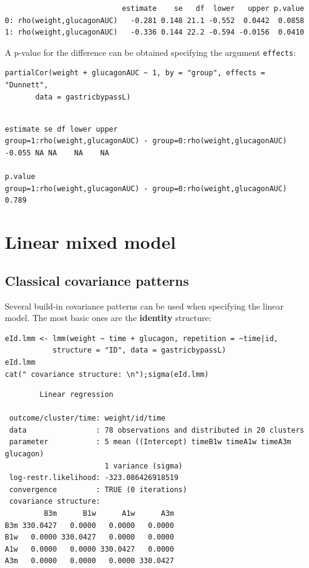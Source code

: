\documentclass[12pt]{article}
\begin{document}
\begin{verbatim}
                           estimate    se   df  lower   upper p.value
0: rho(weight,glucagonAUC)   -0.281 0.148 21.1 -0.552  0.0442  0.0858
1: rho(weight,glucagonAUC)   -0.336 0.144 22.2 -0.594 -0.0156  0.0410
\end{verbatim}


A p-value for the difference can be obtained specifying the argument
\texttt{effects}:
\lstset{language=r,label= ,caption= ,captionpos=b,numbers=none}
\begin{lstlisting}
partialCor(weight + glucagonAUC ~ 1, by = "group", effects = "Dunnett",
	   data = gastricbypassL)
\end{lstlisting}

\begin{verbatim}
                                                                  estimate se df lower upper
group=1:rho(weight,glucagonAUC) - group=0:rho(weight,glucagonAUC)   -0.055 NA NA    NA    NA
                                                                  p.value
group=1:rho(weight,glucagonAUC) - group=0:rho(weight,glucagonAUC)   0.789
\end{verbatim}


\clearpage

\section{Linear mixed model}
\label{sec:org8316d10}
\subsection{Classical covariance patterns}
\label{sec:org7509ee0}

Several build-in covariance patterns can be used when specifying the
linear model. The most basic ones are the \textbf{identity} structure:
\lstset{language=r,label= ,caption= ,captionpos=b,numbers=none}
\begin{lstlisting}
eId.lmm <- lmm(weight ~ time + glucagon, repetition = ~time|id, 
	       structure = "ID", data = gastricbypassL)
eId.lmm
cat(" covariance structure: \n");sigma(eId.lmm)
\end{lstlisting}

\begin{verbatim}
		Linear regression 

 outcome/cluster/time: weight/id/time 
 data                : 78 observations and distributed in 20 clusters 
 parameter           : 5 mean ((Intercept) timeB1w timeA1w timeA3m glucagon) 
                       1 variance (sigma) 
 log-restr.likelihood: -323.086426918519 
 convergence         : TRUE (0 iterations)
 covariance structure: 
         B3m      B1w      A1w      A3m
B3m 330.0427   0.0000   0.0000   0.0000
B1w   0.0000 330.0427   0.0000   0.0000
A1w   0.0000   0.0000 330.0427   0.0000
A3m   0.0000   0.0000   0.0000 330.0427
\end{verbatim}
\end{document}
